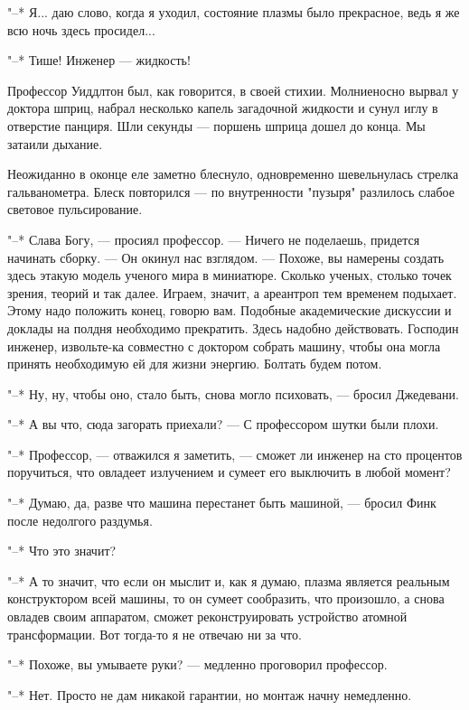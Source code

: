 "--* Я... даю слово, когда я уходил,  состояние  плазмы  было  прекрасное,
ведь я же всю ночь здесь просидел...

"--* Тише! Инженер --- жидкость!

Профессор Уиддлтон был, как  говорится,  в  своей  стихии.  Молниеносно
вырвал у доктора шприц, набрал  несколько  капель  загадочной  жидкости  и
сунул иглу в отверстие панциря. Шли секунды  ---  поршень  шприца  дошел  до
конца. Мы затаили дыхание.

Неожиданно в оконце еле  заметно  блеснуло,  одновременно  шевельнулась
стрелка  гальванометра.  Блеск  повторился  ---  по  внутренности   "пузыря"
разлилось слабое световое пульсирование.

"--* Слава Богу, --- просиял профессор.  ---  Ничего  не  поделаешь,  придется
начинать сборку. --- Он окинул нас взглядом. --- Похоже, вы  намерены  создать
здесь этакую модель ученого мира  в  миниатюре.  Сколько  ученых,  столько
точек зрения, теорий и так далее. Играем, значит, а ареантроп тем временем
подыхает. Этому надо положить конец, говорю  вам.  Подобные  академические
дискуссии  и  доклады  на  полдня  необходимо  прекратить.  Здесь  надобно
действовать. Господин инженер, извольте-ка совместно  с  доктором  собрать
машину, чтобы она могла принять необходимую ей для жизни энергию.  Болтать
будем потом.

"--* Ну, ну, чтобы оно,  стало  быть,  снова  могло  психовать,  ---  бросил
Джедевани.

"--* А вы что, сюда загорать приехали? --- С профессором шутки были плохи.

"--* Профессор, --- отважился  я  заметить,  ---  сможет  ли  инженер  на  сто
процентов поручиться, что овладеет излучением и  сумеет  его  выключить  в
любой момент?

"--* Думаю, да, разве что машина перестанет быть машиной,  ---  бросил  Финк
после недолгого раздумья.

"--* Что это значит?

"--* А то значит, что если он мыслит  и,  как  я  думаю,  плазма  является
реальным  конструктором  всей  машины,  то  он  сумеет   сообразить,   что
произошло,  а  снова  овладев  своим  аппаратом,  сможет  реконструировать
устройство атомной трансформации. Вот тогда-то я не отвечаю ни за что.

"--* Похоже, вы умываете руки? --- медленно проговорил профессор.

"--* Нет. Просто не дам никакой гарантии, но монтаж начну немедленно.

